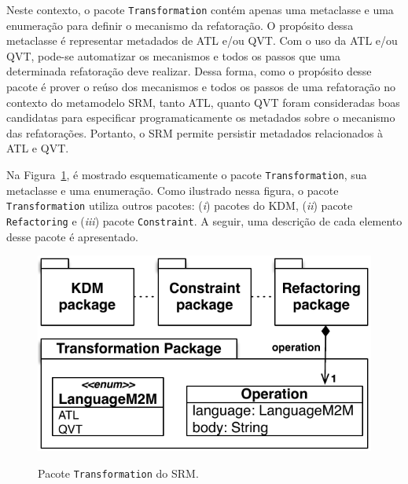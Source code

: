 Neste contexto, o pacote \texttt{Transformation} contém apenas uma metaclasse e uma enumeração para definir o mecanismo da refatoração. O propósito dessa metaclasse é representar metadados de ATL e/ou QVT. Com o uso da ATL e/ou QVT, pode-se automatizar os mecanismos e todos os passos que uma determinada refatoração deve realizar. Dessa forma, como o propósito desse pacote é prover o reúso dos mecanismos e todos os passos de uma refatoração no contexto do metamodelo SRM, tanto ATL, quanto QVT foram consideradas boas candidatas para especificar programaticamente os metadados sobre o mecanismo das refatorações. Portanto, o SRM permite persistir metadados relacionados à ATL e QVT.

Na Figura~\ref{fig:pacote_transformation_srm}, é mostrado esquematicamente o pacote \texttt{Transformation}, sua metaclasse e uma enumeração. Como ilustrado nessa figura, o pacote \texttt{Transformation} utiliza outros pacotes: (\textit{i}) pacotes do KDM, (\textit{ii}) pacote \texttt{Refactoring} e (\textit{iii}) pacote \texttt{Constraint}. A seguir, uma descrição de cada elemento desse pacote é apresentado.

\begin{figure}[h]
	\centering
		\caption{Pacote \texttt{Transformation} do SRM.}
	\includegraphics[scale=0.70]{images/TransformationPackageSRM4}
	\label{fig:pacote_transformation_srm}
	\fautor
\end{figure}

